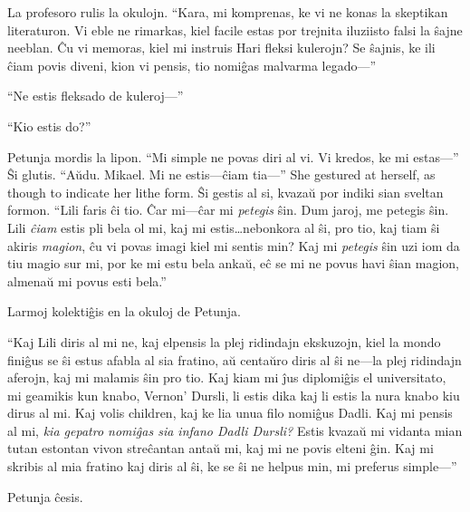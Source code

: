La profesoro rulis la okulojn.
“Kara, mi komprenas, ke vi ne konas la skeptikan literaturon.
Vi eble ne rimarkas, kiel facile estas por trejnita iluziisto falsi la ŝajne neeblan.
Ĉu vi memoras, kiel mi instruis Hari fleksi kulerojn?
Se ŝajnis, ke ili ĉiam povis diveni, kion vi pensis, tio nomiĝas malvarma legado—”

“Ne estis fleksado de kuleroj—”

“Kio estis do?”

Petunja mordis la lipon.
“Mi simple ne povas diri al vi.
Vi kredos, ke mi estas—”
Ŝi glutis.
“Aŭdu.
Mikael.
Mi ne estis—ĉiam tia—”
She gestured at herself, as though to indicate her lithe form.
Ŝi gestis al si, kvazaŭ por indiki sian sveltan formon.
“Lili faris ĉi tio.
Ĉar mi—ĉar mi \emph{petegis} ŝin.
Dum jaroj, me petegis ŝin.
Lili \emph{ĉiam} estis pli bela ol mi, kaj mi estis…nebonkora al ŝi, pro tio, kaj tiam ŝi akiris \emph{magion}, ĉu vi povas imagi kiel mi sentis min?
Kaj mi \emph{petegis} ŝin uzi iom da tiu magio sur mi, por ke mi estu bela ankaŭ, eĉ se mi ne povus havi ŝian magion, almenaŭ mi povus esti bela.”

Larmoj kolektiĝis en la okuloj de Petunja.

“Kaj Lili diris al mi ne, kaj elpensis la plej ridindajn ekskuzojn, kiel la mondo finiĝus se ŝi estus afabla al sia fratino, aŭ centaŭro diris al ŝi ne—la plej ridindajn aferojn, kaj mi malamis ŝin pro tio.
Kaj kiam mi ĵus diplomiĝis el universitato, mi geamikis kun knabo, Vernon' Dursli, li estis dika kaj li estis la nura knabo kiu dirus al mi.
Kaj volis children, kaj ke lia unua filo nomiĝus Dadli.
Kaj mi pensis al mi, \emph{kia gepatro nomiĝas sia infano Dadli Dursli?}
Estis kvazaŭ mi vidanta mian tutan estontan vivon streĉantan antaŭ mi, kaj mi ne povis elteni ĝin.
Kaj mi skribis al mia fratino kaj diris al ŝi, ke se ŝi ne helpus min, mi preferus simple—”

Petunja ĉesis.



